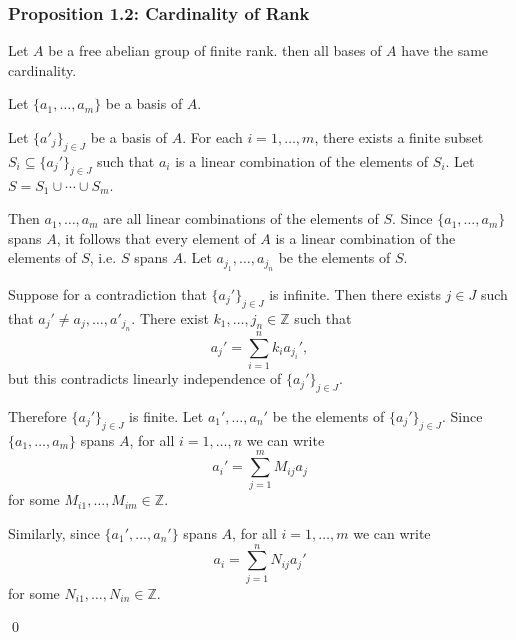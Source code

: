 \documentclass{article}
\renewenvironment{proof}{{\bfseries\color{blue1} Proof:}}{\qed}
\begin{document}
\subsubsection{Proposition 1.2: Cardinality of Rank}
\begin{idea}
    Let $A$ be a free abelian group of finite rank. then all bases of $A$ have the same cardinality.
\end{idea}
\begin{proof}
    Let $\{a_1,\dots,a_m\}$ be a basis of $A$.

    Let $\{a'_j\}_{j\in J}$ be a basis of $A$. For each $i=1,\dots,m$, there exists a finite subset $S_i \subseteq \{a_j'\}_{j\in J}$ such that $a_i$ is a linear combination of the elements of $S_i$. Let $S=S_1 \cup \cdots \cup S_m$.

    Then $a_1,\dots,a_m$ are all linear combinations of the elements of $S$. Since $\{a_1,\dots,a_m\}$ spans $A$, it follows that every element of $A$ is a linear combination of the elements of $S$, i.e. $S$ spans $A$. Let $a_{j_1},\dots,a_{j_n}$ be the elements of $S$.

    Suppose for a contradiction that $\{a_j'\}_{j\in J}$ is infinite. Then there exists $j\in J$ such that $a_j' \neq a_j,\dots, a'_{j_n}$. There exist $k_1,\dots,j_n\in \mathbb{Z}$ such that
    \begin{equation}
        a_j' = \sum_{i=1}^{n}k_ia_{j_i}',
    \end{equation}
    but this contradicts linearly independence of $\{a_j'\}_{j\in J}$.

    Therefore $\{a_j'\}_{j\in J}$ is finite. Let $a_1',\dots,a_n'$ be the elements of $\{a_j'\}_{j\in J}$. Since $\{a_1,\dots,a_m\}$ spans $A$, for all $i=1,\dots,n$ we can write
    \begin{equation}
        a_i' = \sum_{j=1}^m M_{ij}a_j
    \end{equation}
    for some $M_{i1},\dots,M_{im}\in \mathbb{Z}$.

    Similarly, since $\{a_1',\dots,a_n'\}$ spans $A$, for all $i=1,\dots,m$ we can write
    \begin{equation}
        a_i = \sum_{j=1}^n N_{ij}a_j'
    \end{equation}
    for some $N_{i1},\dots,N_{in}\in \mathbb{Z}$.


\end{proof}
\end{document}
